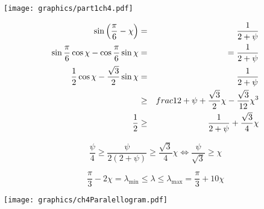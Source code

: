 \begin{minipage}{\linewidth}
\begin{center}
\texttt{[image: graphics/part1ch4.pdf]}
\label{fig:part1ch4.pdf}
\end{center}
\end{minipage}
\begin{eqnarray*}
\sin \left( \frac{\pi}{6}- \chi \right) &=& \frac{1}{2+ \psi}\\
\sin \frac{\pi}{6} \cos \chi - \cos \frac{\pi}{6} \sin \chi &=& = \frac{1}{2+\psi}\\
\frac{1}{2} \cos \chi - \frac{\sqrt{3}}{2} \sin \chi &=& \frac{1}{2+\psi}\\
&\geq& frac{1}{2+\psi} + \frac{\sqrt{3}}{2} \chi - \frac{\sqrt{3}}{12} \chi^3 \\
\frac{1}{2} &\geq&  \frac{1}{2+\psi} + \frac{\sqrt{3}}{4} \chi\\
\end{eqnarray*}

$$\frac{\psi}{4} \geq \frac{\psi}{2 (2 + \psi)}\geq \frac{\sqrt{3}}{4} \chi\iff \frac{\psi}{\sqrt{3}} \geq \chi$$

$$\frac{\pi}{3} - 2 \chi = \lambda_\text{min} \leq \lambda \leq \lambda_\text{max} = \frac{\pi}{3} + 10 \chi$$


\begin{minipage}{\linewidth}
\begin{center}
\texttt{[image: graphics/ch4Paralellogram.pdf]}
\label{fig:ch4Paralellogram.pdf}
\end{center}
\end{minipage}